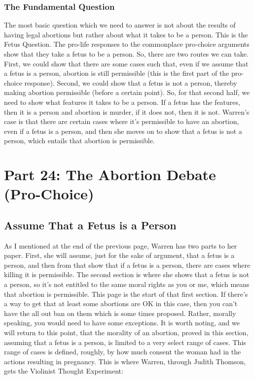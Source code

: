 \subsection{The Fundamental Question}

The most basic question which we need to answer is not about the results of having legal abortions but rather about what it takes to be a person. This is the Fetus Question. The pro-life responses to the commonplace pro-choice arguments show that they take a fetus to be a person. So, there are two routes we can take. First, we could show that there are some cases such that, even if we assume that a fetus is a person, abortion is still permissible (this is the first part of the pro-choice response). Second, we could show that a fetus is not a person, thereby making abortion permissible (before a certain point). So, for that second half, we need to show what features it takes to be a person. If a fetus has the features, then it is a person and abortion is murder, if it does not, then it is not. Warren's case is that there are certain cases where it's permissible to have an abortion, even if a fetus is a person, and then she moves on to show that a fetus is not a person, which entails that abortion is permissible.

\chapter{Part 24: The Abortion Debate (Pro-Choice)}
\section{Assume That a Fetus is a Person}
As I mentioned at the end of the previous page, Warren has two parts to her paper. First, she will assume, just for the sake of argument, that a fetus is a person, and then from that show that if a fetus is a person, there are cases where killing it is permissible. The second section is where she shows that a fetus is not a person, so it's not entitled to the same moral rights as you or me, which means that abortion is permissible. This page is the start of that first section. If there's a way to get that at least some abortions are OK in this case, then you can't have the all out ban on them which is some times proposed. Rather, morally speaking, you would need to have some exceptions. It is worth noting, and we will return to this point, that the morality of an abortion, proved in this section, assuming that a fetus is a person, is limited to a very select range of cases. This range of cases is defined, roughly, by how much consent the woman had in the actions resulting in pregnancy.  This is where Warren, through Judith Thomson, gets the Violinist Thought Experiment:\autocite{Thomson1}

